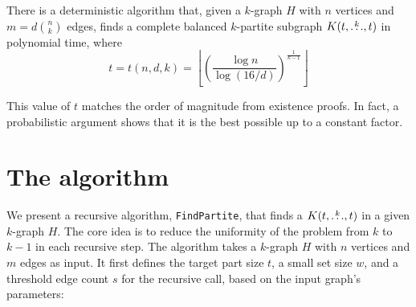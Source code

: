 \begin{theorem} \label{thm:main_theorem}
There is a deterministic algorithm that, given a $k$-graph $H$ with $n$ vertices and $m=d \binom{n}{k}$ edges, finds a complete balanced $k$-partite subgraph $K(t, \overset{k}{\dots}, t)$ in polynomial time, where
\[
    t = t(n, d, k) = \left\lfloor \left( \frac{\log n}{\log (16/d)}  \right)^{\frac{1}{k-1}} \right \rfloor
\]
\end{theorem}
This value of $t$ matches the order of magnitude from existence proofs.
In fact, a probabilistic argument shows that it is the best possible up to a constant factor.

\section{The algorithm}\label{sec:finding-a-balanced-$k$-partite-subgraph}

We present a recursive algorithm, \texttt{FindPartite}, that finds a $K(t, \overset{k}{\dots}, t)$ in a given $k$-graph $H$.
The core idea is to reduce the uniformity of the problem from $k$ to $k-1$ in each recursive step.
The algorithm takes a $k$-graph $H$ with $n$ vertices and $m$ edges as input.
It first defines the target part size $t$, a small set size $w$,
and a threshold edge count $s$ for the recursive call, based on the input graph's parameters:

